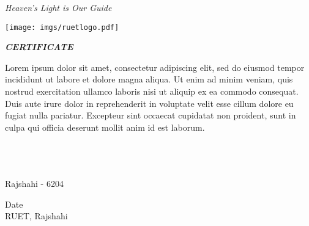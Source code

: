 \documentclass[document.tex]{subfiles}
\begin{document}

\begin{center}
        \textit{Heaven's Light is Our Guide}
        \vspace{1cm}
        
        \texttt{[image: imgs/ruetlogo.pdf]}
        
        \vspace{1cm}
        \textbf{{\fontsize{14pt}{0.5cm}\selectfont \dept}}
        
        \vspace{1cm}
        \textbf{{\fontsize{13pt}{0.5cm}\selectfont \ruet}}
        
        \vspace{1cm}
        \textbf{{\fontsize{16pt}{0.5cm}\selectfont \textit{CERTIFICATE}}}
        
        \vspace{1cm}
        
\end{center}

\noindent Lorem ipsum dolor sit amet, consectetur adipiscing elit, sed do eiusmod tempor incididunt ut labore et dolore magna aliqua. Ut enim ad minim veniam, quis nostrud exercitation ullamco laboris nisi ut aliquip ex ea commodo consequat. Duis aute irure dolor in reprehenderit in voluptate velit esse cillum dolore eu fugiat nulla pariatur. Excepteur sint occaecat cupidatat non proident, sunt in culpa qui officia deserunt mollit anim id est laborum.

\vspace{2cm}

\noindent\textbf{\thesissupervisor}\\
\noindent\textbf{\thesissupervisordesignation}\\
\noindent \ruet\\
\noindent Rajshahi - 6204
\vspace{1cm}

{\fontsize{14pt}{0.5cm}\selectfont\noindent Date}\\
{\fontsize{14pt}{0.5cm}\selectfont\noindent RUET, Rajshahi}\\
\end{document}
